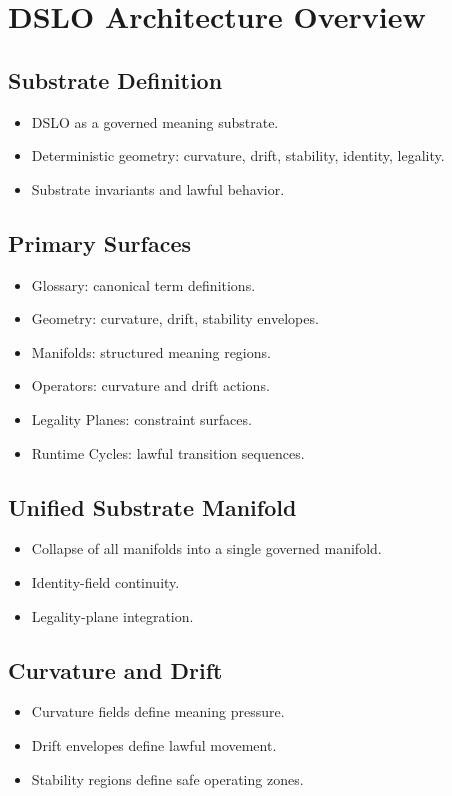 \section{DSLO Architecture Overview}

\subsection{Substrate Definition}
\begin{itemize}
    \item DSLO as a governed meaning substrate.
    \item Deterministic geometry: curvature, drift, stability, identity, legality.
    \item Substrate invariants and lawful behavior.
\end{itemize}

\subsection{Primary Surfaces}
\begin{itemize}
    \item Glossary: canonical term definitions.
    \item Geometry: curvature, drift, stability envelopes.
    \item Manifolds: structured meaning regions.
    \item Operators: curvature and drift actions.
    \item Legality Planes: constraint surfaces.
    \item Runtime Cycles: lawful transition sequences.
\end{itemize}

\subsection{Unified Substrate Manifold}
\begin{itemize}
    \item Collapse of all manifolds into a single governed manifold.
    \item Identity-field continuity.
    \item Legality-plane integration.
\end{itemize}

\subsection{Curvature and Drift}
\begin{itemize}
    \item Curvature fields define meaning pressure.
    \item Drift envelopes define lawful movement.
    \item Stability regions define safe operating zones.
\end{itemize}

